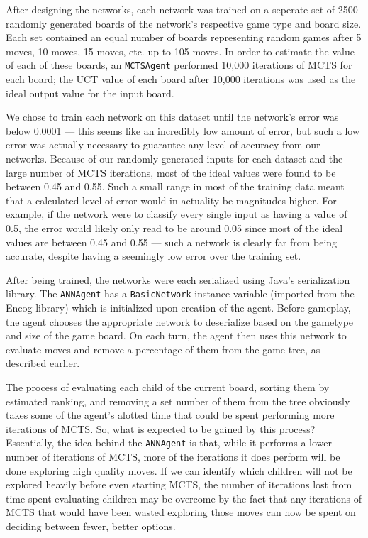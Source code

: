 After designing the networks, each network was trained on a seperate set of 2500 randomly generated boards of the network's respective game type and board size.  Each set contained an equal number of boards representing random games after 5 moves, 10 moves, 15 moves, etc. up to 105 moves.  In order to estimate the value of each of these boards, an \texttt{MCTSAgent} performed 10,000 iterations of MCTS for each board; the UCT value of each board after 10,000 iterations was used as the ideal output value for the input board.  

We chose to train each network on this dataset until the network's error was below 0.0001 --- this seems like an incredibly low amount of error, but such a low error was actually necessary to guarantee any level of accuracy from our networks.  Because of our randomly generated inputs for each dataset and the large number of MCTS iterations, most of the ideal values were found to be between 0.45 and 0.55.  Such a small range in most of the training data meant that a calculated level of error would in actuality be magnitudes higher.  For example, if the network were to classify every single input as having a value of 0.5, the error would likely only read to be around 0.05 since most of the ideal values are between 0.45 and 0.55 --- such a network is clearly far from being accurate, despite having a seemingly low error over the training set.

After being trained, the networks were each serialized using Java's serialization library.  The \texttt{ANNAgent} has a \texttt{BasicNetwork} instance variable (imported from the Encog library) which is initialized upon creation of the agent.  Before gameplay, the agent chooses the appropriate network to deserialize based on the gametype and size of the game board.  On each turn, the agent then uses this network to evaluate moves and remove a percentage of them from the game tree, as described earlier.

The process of evaluating each child of the current board, sorting them by estimated ranking, and removing a set number of them from the tree obviously takes some of the agent's alotted time that could be spent performing more iterations of MCTS.  So, what is expected to be gained by this process?  Essentially, the idea behind the \texttt{ANNAgent} is that, while it performs a lower number of iterations of MCTS, more of the iterations it does perform will be done exploring high quality moves.  If we can identify which children will not be explored heavily before even starting MCTS, the number of iterations lost from time spent evaluating children may be overcome by the fact that any iterations of MCTS that would have been wasted exploring those moves can now be spent on deciding between fewer, better options.


